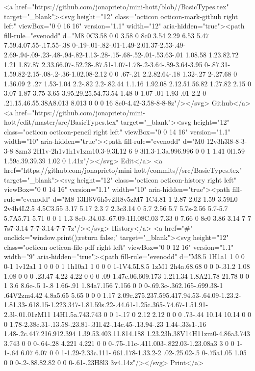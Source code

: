       <a href="https://github.com/jonaprieto/mini-hott/blob//BasicTypes.tex" target="_blank"><svg height="12" class="octicon octicon-mark-github right left" viewBox="0 0 16 16" version="1.1" width="12" aria-hidden="true"><path fill-rule="evenodd" d="M8 0C3.58 0 0 3.58 0 8c0 3.54 2.29 6.53 5.47 7.59.4.07.55-.17.55-.38 0-.19-.01-.82-.01-1.49-2.01.37-2.53-.49-2.69-.94-.09-.23-.48-.94-.82-1.13-.28-.15-.68-.52-.01-.53.63-.01 1.08.58 1.23.82.72 1.21 1.87.87 2.33.66.07-.52.28-.87.51-1.07-1.78-.2-3.64-.89-3.64-3.95 0-.87.31-1.59.82-2.15-.08-.2-.36-1.02.08-2.12 0 0 .67-.21 2.2.82.64-.18 1.32-.27 2-.27.68 0 1.36.09 2 .27 1.53-1.04 2.2-.82 2.2-.82.44 1.1.16 1.92.08 2.12.51.56.82 1.27.82 2.15 0 3.07-1.87 3.75-3.65 3.95.29.25.54.73.54 1.48 0 1.07-.01 1.93-.01 2.2 0 .21.15.46.55.38A8.013 8.013 0 0 0 16 8c0-4.42-3.58-8-8-8z"/></svg> Github</a>
      <a href="https://github.com/jonaprieto/mini-hott/edit/master/src/BasicTypes.tex" target="_blank"><svg height="12" class="octicon octicon-pencil right left" viewBox="0 0 14 16" version="1.1" width="10" aria-hidden="true"><path fill-rule="evenodd" d="M0 12v3h3l8-8-3-3-8 8zm3 2H1v-2h1v1h1v1zm10.3-9.3L12 6 9 3l1.3-1.3a.996.996 0 0 1 1.41 0l1.59 1.59c.39.39.39 1.02 0 1.41z"/></svg> Edit</a>
      <a href="https://github.com/jonaprieto/mini-hott/commits//src/BasicTypes.tex" target="_blank"><svg height="12" class="octicon octicon-history right left" viewBox="0 0 14 16" version="1.1" width="10" aria-hidden="true"><path fill-rule="evenodd" d="M8 13H6V6h5v2H8v5zM7 1C4.81 1 2.87 2.02 1.59 3.59L0 2v4h4L2.5 4.5C3.55 3.17 5.17 2.3 7 2.3c3.14 0 5.7 2.56 5.7 5.7s-2.56 5.7-5.7 5.7A5.71 5.71 0 0 1 1.3 8c0-.34.03-.67.09-1H.08C.03 7.33 0 7.66 0 8c0 3.86 3.14 7 7 7s7-3.14 7-7-3.14-7-7-7z"/></svg> History</a>
      <a  href="#" onclick="window.print();return false;" target="_blank"><svg height="12" class="octicon octicon-file-pdf right left" viewBox="0 0 12 16" version="1.1" width="9" aria-hidden="true"><path fill-rule="evenodd" d="M8.5 1H1a1 1 0 0 0-1 1v12a1 1 0 0 0 1 1h10a1 1 0 0 0 1-1V4.5L8.5 1zM1 2h4a.68.68 0 0 0-.31.2 1.08 1.08 0 0 0-.23.47 4.22 4.22 0 0 0-.09 1.47c.06.609.173 1.211.34 1.8A21.78 21.78 0 0 1 3.6 8.6c-.5 1-.8 1.66-.91 1.84a7.156 7.156 0 0 0-.69.3c-.362.165-.699.38-1 .64V2zm4.42 4.8a5.65 5.65 0 0 0 1.17 2.09c.275.237.595.417.94.53-.64.09-1.23.2-1.81.33-.618.15-1.223.347-1.81.59s.22-.44.61-1.25c.365-.74.67-1.51.91-2.3l-.01.01zM11 14H1.5a.743.743 0 0 1-.17 0 2.12 2.12 0 0 0 .73-.44 10.14 10.14 0 0 0 1.78-2.38c.31-.13.58-.23.81-.31l.42-.14c.45-.13.94-.23 1.44-.33s1-.16 1.48-.2c.447.216.912.394 1.39.53.403.11.814.188 1.23.23h.38V14H11zm0-4.86a3.743 3.743 0 0 0-.64-.28 4.221 4.221 0 0 0-.75-.11c-.411.003-.822.03-1.23.08a3 3 0 0 1-1-.64 6.07 6.07 0 0 1-1.29-2.33c.111-.661.178-1.33.2-2 .02-.25.02-.5 0-.75a1.05 1.05 0 0 0-.2-.88.82.82 0 0 0-.61-.23H8l3 3v4.14z"/></svg> Print</a>
